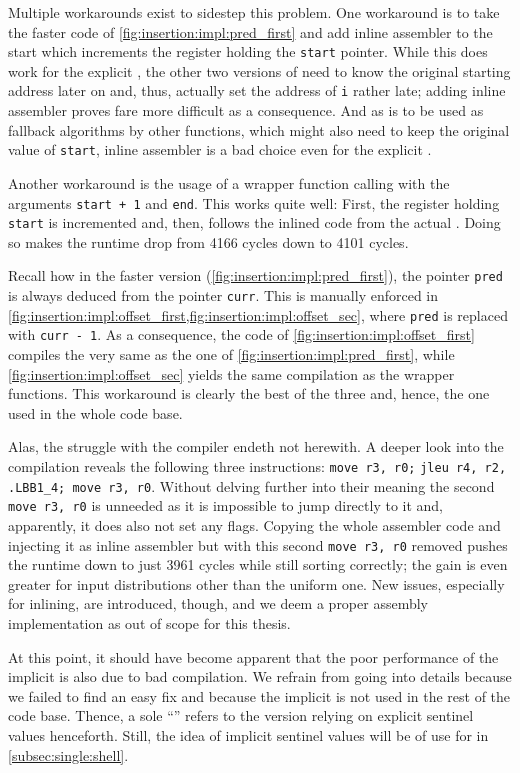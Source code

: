 Multiple workarounds exist to sidestep this problem.
One workaround is to take the faster code of \cref{fig:insertion:impl:pred_first} and add inline assembler to the start which increments the register holding the \lstinline|start| pointer.
While this does work for the explicit \IS{}, the other two versions of \IS{} need to know the original starting address later on and, thus, actually set the address of \lstinline|i| rather late;
adding inline assembler proves fare more difficult as a consequence.
And as \IS{} is to be used as fallback algorithms by other functions, which might also need to keep the original value of \lstinline|start|, inline assembler is a bad choice even for the explicit \IS{}.

Another workaround is the usage of a wrapper function calling \IS{} with the arguments \lstinline|start + 1| and \lstinline|end|.
This works quite well:
First, the register holding \lstinline|start| is incremented and, then, follows the inlined code from the actual \IS{}.
Doing so makes the runtime drop from 4166 cycles down to 4101 cycles.

Recall how in the faster version (\cref{fig:insertion:impl:pred_first}), the pointer \lstinline|pred| is always deduced from the pointer \lstinline|curr|.
This is manually enforced in \cref{fig:insertion:impl:offset_first,fig:insertion:impl:offset_sec}, where \lstinline|pred| is replaced with \lstinline|curr - 1|.
As a consequence, the code of \cref{fig:insertion:impl:offset_first} compiles the very same as the one of \cref{fig:insertion:impl:pred_first}, while \cref{fig:insertion:impl:offset_sec} yields the same compilation as the wrapper functions.
This workaround is clearly the best of the three and, hence, the one used in the whole code base.

Alas, the struggle with the compiler endeth not herewith.
A deeper look into the compilation reveals the following three instructions:
\lstinline|move r3, r0;| \lstinline|jleu r4, r2,| \lstinline|.LBB1_4; move r3, r0|.
Without delving further into their meaning \Dash the second \lstinline|move r3, r0| is unneeded as it is impossible to jump directly to it and, apparently, it does also not set any flags.
Copying the whole assembler code and injecting it as inline assembler but with this second \lstinline|move r3, r0| removed pushes the runtime down to just 3961 cycles while still sorting correctly;
the gain is even greater for input distributions other than the uniform one.
New issues, especially for inlining, are introduced, though, and we deem a proper assembly implementation as out of scope for this thesis.

At this point, it should have become apparent that the poor performance of the implicit \IS{} is also due to bad compilation.
We refrain from going into details because we failed to find an easy fix and because the implicit \IS{} is not used in the rest of the code base.
Thence, a sole \enquote{\IS{}} refers to the version relying on explicit sentinel values henceforth.
Still, the idea of implicit sentinel values will be of use for \ShS{} in \cref{subsec:single:shell}.
